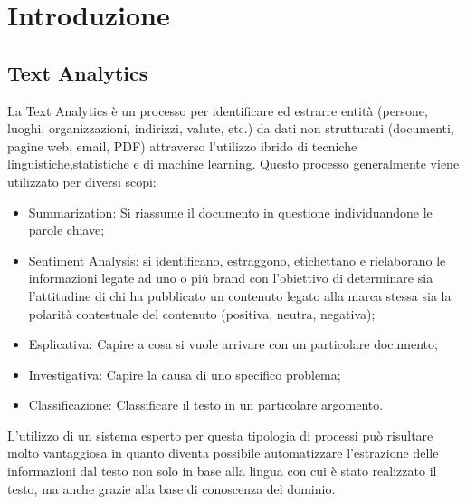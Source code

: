 \section{Introduzione}

\subsection{Text Analytics}
\nocite{wiki:textMining}
\nocite{gartner:textAnalytics}
\nocite{expertsystem:textAnalytics}
La Text Analytics è un processo per identificare ed estrarre entità (persone, luoghi, organizzazioni, indirizzi, valute, etc.) da dati non strutturati (documenti, pagine web, email, PDF) attraverso l'utilizzo ibrido di tecniche linguistiche,statistiche e di machine learning. Questo processo generalmente viene utilizzato per diversi scopi:
\begin{itemize}
	\item Summarization: Si riassume il documento in questione individuandone le parole chiave;
	\item Sentiment Analysis: si identificano, estraggono, etichettano e rielaborano le informazioni legate ad uno o più brand con l'obiettivo di determinare sia l'attitudine di chi ha pubblicato un contenuto legato alla marca stessa sia la polarità contestuale del contenuto (positiva, neutra, negativa);
	\item Esplicativa: Capire a cosa si vuole arrivare con un particolare documento;
	\item Investigativa: Capire la causa di uno specifico problema;
	\item Classificazione: Classificare il testo in un particolare argomento.
\end{itemize}

L'utilizzo di un sistema esperto per questa tipologia di processi può risultare molto vantaggiosa in quanto diventa possibile automatizzare l'estrazione delle informazioni dal testo non solo in base alla lingua con cui è stato realizzato il testo, ma anche grazie alla base di conoscenza del dominio.




